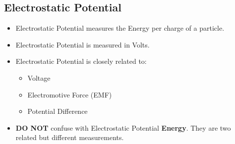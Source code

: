\documentclass[letterpaper, 12pt]{article}
\begin{document}
\subsection*{Electrostatic Potential}
\begin{itemize}
\item Electrostatic Potential measures the Energy per charge of a particle.
\item Electrostatic Potential is measured in Volts.
\item Electrostatic Potential is closely related to:
	\begin{itemize}
		\item Voltage
		\item Electromotive Force (EMF)
		\item Potential Difference
	\end{itemize}
\item \textbf{DO NOT} confuse with Electrostatic Potential \textbf{Energy}.  They are two related but different measurements. 
	
\end{itemize}

 
\end{document}
